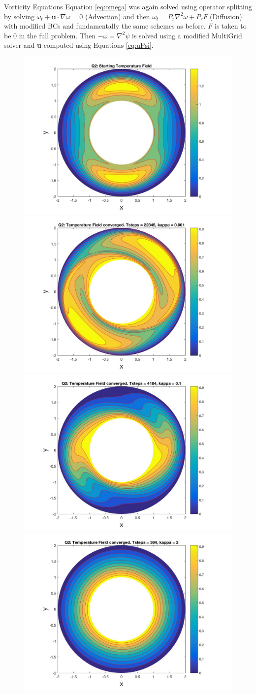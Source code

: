 \documentclass[final]{beamer}
\newlength{\onecolwid}
\newlength{\twocolwid}
\begin{document}
\begin{frame}[t]
\begin{columns}[t]
\begin{column}{\twocolwid}
\begin{columns}[t,totalwidth=\twocolwid]
\begin{column}{\onecolwid}
\begin{block}{Vorticity Equations}
Equation \ref{eq:omega} was again solved using operator splitting by solving $\omega_t + \textbf{u}\cdot \nabla \omega = 0$ (Advection) and then $\omega_t = P_r\nabla^2\omega + P_rF$ (Diffusion) with modified BCs and fundamentally the same schemes as before. $F$ is taken to be $0$ in the full problem. Then $-\omega = \nabla^2\psi$ is solved using a modified MultiGrid solver and \textbf{u} computed using Equations \ref{eq:uPsi}.

\end{block}

\begin{figure}
\includegraphics[width= .5\linewidth]{../project_3/fig_q2KappaStart.jpg}
\includegraphics[width= .5\linewidth]{../project_3/fig_q2Kappa0001.jpg}\\
\includegraphics[width= .5\linewidth]{../project_3/fig_q2Kappa01.jpg}
\includegraphics[width= .5\linewidth]{../project_3/fig_q2Kappa2.jpg}

\end{figure}
\end{column}
\end{columns}
\end{column}
\end{columns}
\end{frame}
\end{document}
